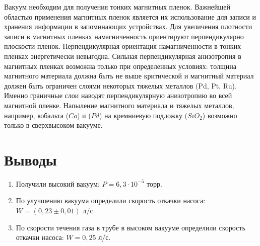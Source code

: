 \documentclass[a4paper,12pt]{article} %
\begin{document}
	Вакуум необходим для получения тонких магнитных пленок. Важнейшей областью применения магнитных пленок является их использование для записи и хранения информации в запоминающих устройствах. Для увеличения плотности записи в магнитных пленках намагниченность ориентируют перпендикулярно плоскости пленок. Перпендикулярная ориентация намагниченности в тонких пленках энергетически невыгодна. Сильная перпендикулярная анизотропия в магнитных пленках возможна только при определенных условиях: толщина магнитного материала должна быть не выше критической и магнитный материал должен быть ограничен слоями некоторых тяжелых металлов (Pd, Pt, Ru). Именно граничные слои наводят перпендикулярную анизотропию во всей магнитной пленке. Напыление магнитного материала и тяжелых металлов, например, кобальта ($Co$) и ($Pd$) на кремниевую подложку ($SiO_2$) возможно только в сверхвысоком вакууме.
	
\section{Выводы}
\begin{enumerate}
\item
	Получили высокий вакуум: $P = 6,3 \cdot 10^{-5}$ торр.

\item
	По улучшению вакуума определили скорость откачки насоса: \\$W = (0,23 \pm 0,01)$ л/с.
	
\item
	По скорости течения газа в трубе в высоком вакууме определили скорость откачки насоса:  $W = 0,25$ л/с.


\end{enumerate}
\end{document}
